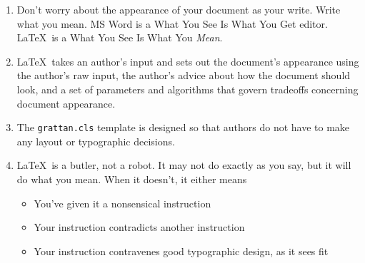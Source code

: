 \documentclass[a4paper,11pt]{scrartcl}\usepackage[]{graphicx}\usepackage[]{color}
\begin{document}
 \begin{enumerate}
  \item Don't worry about the appearance of your document as your write. Write what you mean. MS Word is a What You See Is What You Get editor. \LaTeX\ is a What You See Is What You \emph{Mean}.
  \item \LaTeX\ takes an author's input and sets out the document's appearance using the author's raw input, the author's advice about how the document should look, and a set of parameters and algorithms that govern tradeoffs concerning document appearance. 
  \item The \verb=grattan.cls= template is designed so that authors do not have to make any layout or typographic decisions.
  \item \LaTeX\ is a butler, not a robot. It may not do exactly as you say, but it will do what you mean. When it doesn't, it either means 
  \begin{itemize}
   \item You've given it a nonsensical instruction
   \item Your instruction contradicts another instruction
   \item Your instruction contravenes good typographic design, as it sees fit
  \end{itemize}


\end{enumerate}
\end{document}
